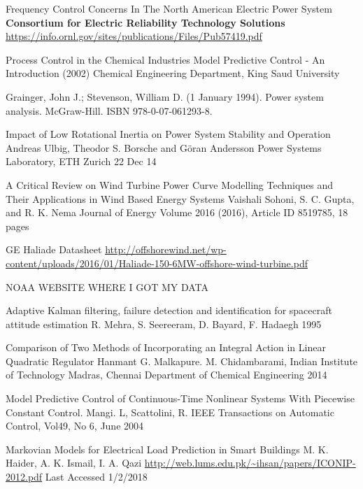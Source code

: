 
\begin{thebibliography}{9}
Frequency Control Concerns In The North American Electric Power System
\textbf{Consortium for Electric Reliability Technology Solutions}
\url{https://info.ornl.gov/sites/publications/Files/Pub57419.pdf}

Process Control in the Chemical Industries
Model Predictive Control - An Introduction (2002)
Chemical Engineering Department,
King Saud University

 Grainger, John J.; Stevenson, William D. (1 January 1994). Power system analysis. McGraw-Hill. ISBN 978-0-07-061293-8.

Impact of Low Rotational Inertia on
Power System Stability and Operation
Andreas Ulbig, Theodor S. Borsche and Göran Andersson Power Systems Laboratory, ETH Zurich
22 Dec 14

A Critical Review on Wind Turbine Power Curve Modelling Techniques and Their Applications in Wind Based Energy Systems
Vaishali Sohoni, S. C. Gupta, and R. K. Nema
Journal of Energy
Volume 2016 (2016), Article ID 8519785, 18 pages

GE Haliade Datasheet
\url{http://offshorewind.net/wp-content/uploads/2016/01/Haliade-150-6MW-offshore-wind-turbine.pdf}

NOAA WEBSITE WHERE I GOT MY DATA

Adaptive Kalman filtering, failure detection and identification for spacecraft attitude estimation
R. Mehra, S. Seereeram, D. Bayard, F. Hadaegh
1995

Comparison of Two Methods of Incorporating an Integral Action in Linear Quadratic Regulator
Hanmant G. Malkapure. M. Chidambarami, Indian Institute of Technology Madras, Chennai
Department of Chemical Engineering
2014

Model Predictive Control of Continuous-Time Nonlinear Systems With Piecewise Constant Control.
Mangi. L, Scattolini, R.
IEEE Transactions on Automatic Control, Vol49, No 6, June 2004



Markovian Models for Electrical Load Prediction in Smart Buildings
M. K. Haider, A. K. Ismail, I. A. Qazi
\url{http://web.lums.edu.pk/~ihsan/papers/ICONIP-2012.pdf}
Last Accessed 1/2/2018


\end{thebibliography}
